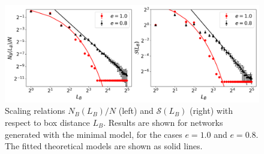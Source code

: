 \begin{figure}[!h]
	\begin{center}
	\includegraphics[scale=0.46]{./images/task_6/N_B_and_S_vs_L_B.png} 
	\end{center}
	\caption{Scaling relations $N_B(L_B) / N$ (left) and $\mathcal{S}(L_B)$ (right) with respect to box distance $L_B$. Results are shown for networks generated with the minimal model, for the cases $e=1.0$ and $e=0.8$. The fitted theoretical models are shown as solid lines. \\} 
	\label{fig:N_B_and_S_vs_L_B} 
\end{figure}





\newpage